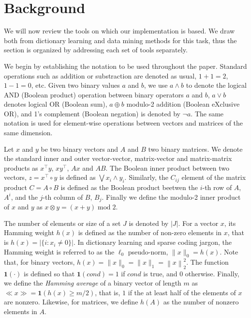 \documentclass[twocolumn]{IEEEtran}
\theoremstyle{definition}
\def\transp{^\intercal}
\begin{document}
\section{Background}
\label{sec:background}
%
%
\def\indicator{\mathbf{1}}
\def\bool{\mathrm{bool}}
\def\bprod{\circ}
\def\bsum{\lor}
\def\bigand{\bigwedge}
\def\bigor{\bigvee}
\def\msum{\oplus}
\def\mprod{\otimes}
\def\mod{\mathrm{mod}}
\newcommand{\iter}[1]{^{(#1)}}
\newcommand{\st}{\ensuremath{\quad\mathrm{s.t.}\quad}}
\newcommand{\norm}[1]{\ensuremath{\left\|#1\right\|}}
\newcommand{\support}[1]{\mathrm{supp}(#1)}
\newcommand{\rankf}[1]{\mathrm{rank}(#1)}
\def\rank{\mathrm{rank}}
\newcommand{\fun}[1]{\mathrm{#1}}
\newcommand{\abs}[1]{\ensuremath{\left|#1\right|}}
\newcommand{\setdef}[1]{\ensuremath{\left\{#1\right\}}}
\newcommand{\setspan}{\ensuremath{\mathrm{span}}}
\newcommand{\svec}[1]{_{[#1]}}
\newcommand{\col}[1]{_{#1}}
\newcommand{\row}[1]{^{#1}}
\newcommand{\havg}[1]{\ll #1 \gg}
%
We will now review the tools on which our implementation is based. We draw both from dictionary learning and data mining methods for this task, thus the section is organized by addressing each set of tools separately. 

We begin by establishing the notation to be used throughout the paper.
Standard operations such as addition or substraction are denoted as usual, $1+1=2$, $1-1=0$, etc. Given two binary values $a$ and $b$, we use $a \land b$ to denote the logical AND (Boolean product) operation between binary operators $a$ and $b$, $a \lor b$ denotes logical OR (Boolean sum),  $a \msum b$ modulo-2 addition (Boolean eXclusive OR), and 1's complement  (Boolean negation) is denoted by $\neg a$. The same notation is used for element-wise operations between vectors and matrices of the same dimension.

Let $x$ and $y$ be two binary vectors and $A$ and $B$ two binary matrices.
We denote the standard  inner and outer vector-vector, matrix-vector and matrix-matrix products as $x{\transp}y$, $xy\transp$, $Ax$ and $AB$.
The Boolean inner product between two vectors, $z = x\transp \bprod y$ is defined as $\bigor x_i \land y_i$. Similarly, the $C_{ij}$ element of the matrix product $C=A \bprod B$ is defined as the Boolean product beetwen the $i$-th row of $A$, $A^i$,  and the $j$-th column of $B$, $B_j$. Finally we define the modulo-2 inner product of $x$ and $y$ as $x \mprod y = (x+y)\;\mod \;2$.

The number of elements or size of a set $J$ is denoted by $|J|$. 
For a vector $x$, its Hamming weight $h(x)$ is defined as the number of non-zero elements in $x$, that is $h(x)=|\{i: x_i \neq 0\}|$. In dictionary learning and sparse coding jargon, the Hamming weight is referred to as the $\ell_0$ pseudo-norm, $\|x\|_0=h(x)$. Note that, for binary vectors, $h(x)=\|x\|_0=\|x\|_1=\norm{x}_2^2$. The function $\indicator(\cdot)$ is defined so that $\indicator(cond)=1$ if $cond$ is true, and $0$ otherwise. 
Finally, we define the \emph{Hamming average} of a binary vector of length $m$  as $\havg{x} = \indicator(h(x) \geq m/2)$, that is, $1$ if the at least half of the elements of $x$ are nonzero. Likewise, for matrices, we define $h(A)$ as the number of nonzero elements in $A$.
\end{document}
